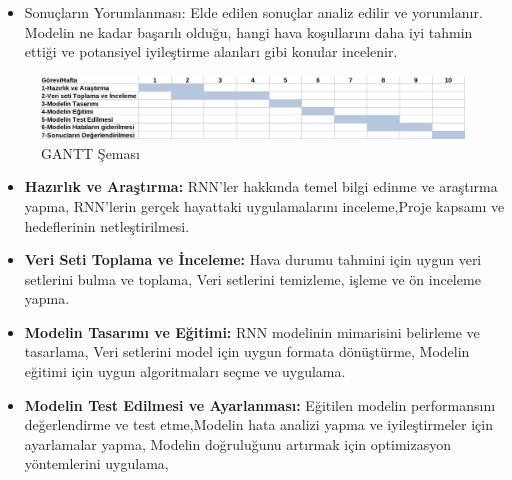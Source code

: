 \documentclass[12pt,a4paper]{article}
\begin{document}
\begin{enumerate}
\begin{itemize}
\item Sonuçların Yorumlanması: Elde edilen sonuçlar analiz edilir ve yorumlanır. Modelin ne kadar başarılı olduğu, hangi hava koşullarını daha iyi tahmin ettiği ve potansiyel iyileştirme alanları gibi konular incelenir.
\end{itemize}
\newpage
  \begin{figure}[h]
  	\caption{GANTT Şeması}
  	\vspace{0.5cm} 
  	\centering
  	 \includegraphics[width=\textwidth,height=\textheight,keepaspectratio]{GanttS.png }
  	
  		\vspace{0.7cm}
  	
  \end{figure}
  \begin{itemize}
         
      \item 
      {\bf\fontsize{12pt}{14pt}\selectfont Hazırlık ve Araştırma:} 
      RNN'ler hakkında temel bilgi edinme ve araştırma yapma, RNN'lerin gerçek hayattaki uygulamalarını inceleme,Proje kapsamı ve hedeflerinin netleştirilmesi.
      \item {\bf\fontsize{12pt}{14pt}\selectfont Veri Seti Toplama ve İnceleme:}  
      Hava durumu tahmini için uygun veri setlerini bulma ve toplama, Veri setlerini temizleme, işleme ve ön inceleme yapma\cite{ulasav_hava_durumu}\cite{ulasav_hava_durumu_verileri}.
      \item {\bf\fontsize{12pt}{14pt}\selectfont  Modelin Tasarımı ve Eğitimi:} 
      RNN modelinin mimarisini belirleme ve tasarlama,
Veri setlerini model için uygun formata dönüştürme, Modelin eğitimi için uygun algoritmaları seçme ve uygulama.
      \item {\bf\fontsize{12pt}{14pt}\selectfont  Modelin Test Edilmesi ve Ayarlanması:} 
      Eğitilen modelin performansını değerlendirme ve test etme,Modelin hata analizi yapma ve iyileştirmeler için ayarlamalar yapma, Modelin doğruluğunu artırmak için optimizasyon yöntemlerini uygulama,
      

\end{itemize}
\end{enumerate}
\end{document}
